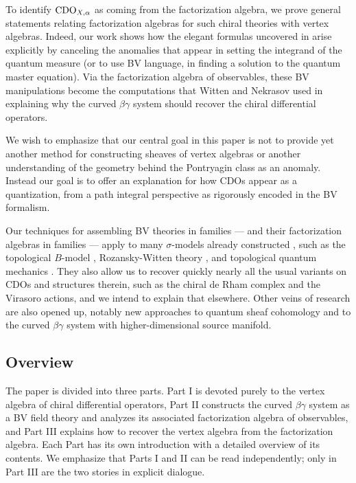 To identify ${\rm CDO}_{X,\alpha}$ as coming from the factorization algebra, we prove general statements relating factorization algebras for such chiral theories with vertex algebras. Indeed, our work shows how the elegant formulas uncovered in \cite{MSV,GMS} arise explicitly by canceling the anomalies that appear in setting the integrand of the quantum measure (or to use BV language, in finding a solution to the quantum master equation). Via the factorization algebra of observables, these BV manipulations become the computations that Witten and Nekrasov used in explaining why the curved $\beta\gamma$ system should recover the chiral differential operators.

\begin{rmk}
We wish to emphasize that our central goal in this paper 
is not to provide yet another method for constructing sheaves of vertex algebras
or another understanding of the geometry behind the Pontryagin class as an anomaly.
Instead our goal is to offer an explanation for how CDOs appear as a quantization,
from a path integral perspective as rigorously encoded in the BV formalism.
\end{rmk}


Our techniques for assembling BV theories in families --- and their factorization algebras in families --- apply to many $\sigma$-models already constructed , such as the topological $B$-model \cite{LiLi}, Rozansky-Witten theory \cite{CLL}, and topological quantum mechanics \cite{GG1, GLL}. They also allow us to recover quickly nearly all the usual variants on CDOs and structures therein, such as the chiral de Rham complex and the Virasoro actions, and we intend to explain that elsewhere. Other veins of research are also opened up, notably new approaches to quantum sheaf cohomology and to the curved $\beta\gamma$ system with higher-dimensional source manifold.

\subsection{Overview}

The paper is divided into three parts. Part I is devoted purely to the vertex algebra of chiral differential operators, Part II constructs the curved $\beta\gamma$ system as a BV field theory and analyzes its associated factorization algebra of observables, and Part III explains how to recover the vertex algebra from the factorization algebra. Each Part has its own introduction with a detailed overview of its contents. We emphasize that Parts I and II can be read independently; only in Part III are the two stories in explicit dialogue.

